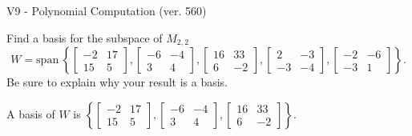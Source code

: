 \begin{exercise}
  \begin{exerciseTitle}V9 - Polynomial Computation (ver. 560)\end{exerciseTitle}
  \begin{exerciseStatement}
    Find a basis for the subspace of \(M_{2,2}\) 
\[W=\mathrm{span}\ \left\{\left[\begin{array}{cc}
-2 & 17 \\
15 & 5
\end{array}\right] , \left[\begin{array}{cc}
-6 & -4 \\
3 & 4
\end{array}\right] , \left[\begin{array}{cc}
16 & 33 \\
6 & -2
\end{array}\right] , \left[\begin{array}{cc}
2 & -3 \\
-3 & -4
\end{array}\right] , \left[\begin{array}{cc}
-2 & -6 \\
-3 & 1
\end{array}\right]\right\}.\]
 Be sure to explain why your result is a basis.


  \end{exerciseStatement}
  \begin{exerciseAnswer}
   A basis of \(W\) is  \(\left\{\left[\begin{array}{cc}
-2 & 17 \\
15 & 5
\end{array}\right] , \left[\begin{array}{cc}
-6 & -4 \\
3 & 4
\end{array}\right] , \left[\begin{array}{cc}
16 & 33 \\
6 & -2
\end{array}\right]\right\}\).
  


  \end{exerciseAnswer}
\end{exercise}
